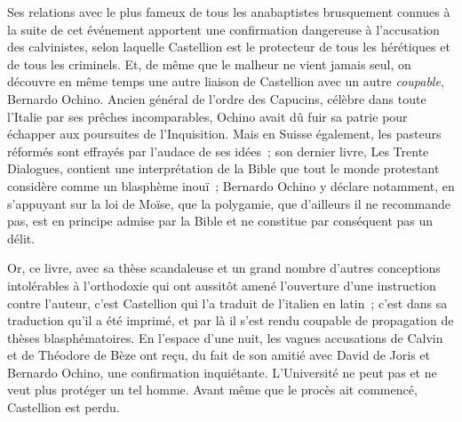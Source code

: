 \documentclass[french,twoside]{book} %
\newcommand{\astermono}{\medskip\centerline{\color{rubric}\large\selectfont{\syms ✻}}\medskip\par}%
\begin{document}
Ses relations avec le plus fameux de tous les anabaptistes brusquement connues à la suite de cet événement apportent une confirmation dangereuse à l’accusation des calvinistes, selon laquelle Castellion est le protecteur de tous les hérétiques et de tous les criminels. Et, de même que le malheur ne vient jamais seul, on découvre en même temps une autre liaison de Castellion avec un autre \emph{coupable}, Bernardo Ochino. Ancien général de l’ordre des Capucins, célèbre dans toute l’Italie par ses prêches incomparables, Ochino avait dû fuir sa patrie pour échapper aux poursuites de l’Inquisition. Mais en Suisse également, les pasteurs réformés sont effrayés par l’audace de ses idées ; son dernier livre, Les Trente Dialogues, contient une interprétation de la Bible que tout le monde protestant considère comme un blasphème inouï ; Bernardo Ochino y déclare notamment, en s’appuyant sur la loi de Moïse, que la polygamie, que d’ailleurs il ne recommande pas, est en principe admise par la Bible et ne constitue par conséquent pas un délit.\par
Or, ce livre, avec sa thèse scandaleuse et un grand nombre d’autres conceptions intolérables à l’orthodoxie qui ont aussitôt amené l’ouverture d’une instruction contre l’auteur, c’est Castellion qui l’a traduit de l’italien en latin ; c’est dans sa traduction qu’il a été imprimé, et par là il s’est rendu coupable de propagation de thèses blasphématoires. En l’espace d’une nuit, les vagues accusations de Calvin et de Théodore de Bèze ont reçu, du fait de son amitié avec David de Joris et Bernardo Ochino, une confirmation inquiétante. L’Université ne peut pas et ne veut plus protéger un tel homme. Avant même que le procès ait commencé, Castellion est perdu.\par

\astermono
\end{document}
